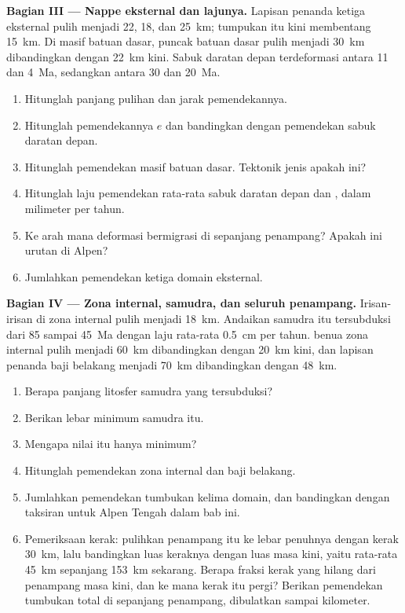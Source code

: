 \begin{problem}
\noindent\textbf{Bagian III --- Nappe eksternal dan lajunya.} Lapisan penanda
ketiga  eksternal pulih menjadi 22, 18, dan \qty{25}{km}; tumpukan itu kini membentang
\qty{15}{km}. Di masif batuan dasar, puncak batuan dasar pulih menjadi \qty{30}{km}
dibandingkan dengan \qty{22}{km} kini. Sabuk daratan depan terdeformasi antara 11 dan \qty{4}{Ma}, sedangkan
 antara 30 dan \qty{20}{Ma}.
\begin{enumerate}[resume]
\item Hitunglah panjang pulihan  dan jarak pemendekannya.
\item Hitunglah pemendekannya $e$ dan bandingkan dengan pemendekan sabuk daratan depan.
\item Hitunglah pemendekan masif batuan dasar. Tektonik jenis apakah ini?
\item Hitunglah laju pemendekan rata-rata sabuk daratan depan dan , dalam
milimeter per tahun.
\item Ke arah mana deformasi bermigrasi di sepanjang penampang? Apakah ini urutan
di Alpen?
\item Jumlahkan pemendekan ketiga domain eksternal.
\end{enumerate}

\noindent\textbf{Bagian IV --- Zona internal, samudra, dan seluruh penampang.}
Irisan-irisan  di zona internal pulih menjadi \qty{18}{km}. Andaikan samudra itu
tersubduksi dari 85 sampai \qty{45}{Ma} dengan laju rata-rata \qty{0.5}{cm} per tahun. 
benua zona internal pulih menjadi \qty{60}{km} dibandingkan dengan \qty{20}{km} kini, dan
lapisan penanda baji belakang menjadi \qty{70}{km} dibandingkan dengan \qty{48}{km}.
\begin{enumerate}[resume]
\item Berapa panjang litosfer samudra yang tersubduksi?
\item Berikan lebar minimum samudra itu.
\item Mengapa nilai itu hanya minimum?
\item Hitunglah pemendekan zona internal dan baji belakang.
\item Jumlahkan pemendekan tumbukan kelima domain, dan bandingkan dengan
taksiran untuk Alpen Tengah dalam bab ini.
\item Pemeriksaan kerak: pulihkan penampang itu ke lebar penuhnya dengan kerak \qty{30}{km}, lalu
bandingkan luas keraknya dengan luas masa kini, yaitu rata-rata \qty{45}{km} sepanjang
\qty{153}{km} sekarang. Berapa fraksi kerak yang hilang dari penampang masa kini, dan ke mana
kerak itu pergi? Berikan pemendekan tumbukan total di sepanjang penampang, dibulatkan sampai
kilometer.
\end{enumerate}
\end{problem}
